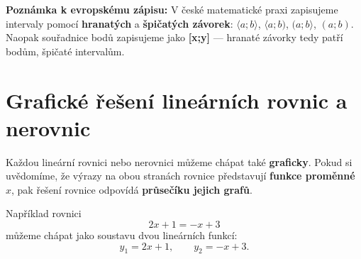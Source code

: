 \documentclass[12pt,a4paper]{article}
\begin{document}
\begin{notebox}
\textbf{Poznámka k evropskému zápisu:}  
V české matematické praxi zapisujeme intervaly pomocí \textbf{hranatých} a \textbf{špičatých závorek}:  
$\langle a;b\rangle$, $\langle a;b)$, $(a;b\rangle$, $(a;b)$.  
Naopak souřadnice bodů zapisujeme jako \textbf{[x;y]} — hranaté závorky tedy patří bodům,  
špičaté intervalům.
\end{notebox}




\section{Grafické řešení lineárních rovnic a nerovnic}


Každou lineární rovnici nebo nerovnici můžeme chápat také \textbf{graficky}.  
Pokud si uvědomíme, že výrazy na obou stranách rovnice představují \textbf{funkce proměnné} \(x\),  
pak řešení rovnice odpovídá \textbf{průsečíku jejich grafů}.  

\medskip

Například rovnici
\[
2x + 1 = -x + 3
\]
můžeme chápat jako soustavu dvou lineárních funkcí:
\[
y_1 = 2x + 1, \qquad y_2 = -x + 3.
\]
\end{document}
